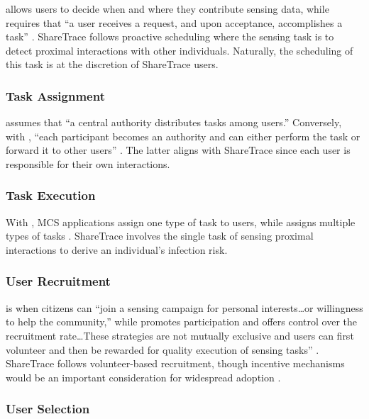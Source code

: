  allows users to decide when and where they contribute sensing data, while  requires that ``a user receives a request, and upon acceptance, accomplishes a task'' \citep{Capponi2019}. ShareTrace follows proactive scheduling where the sensing task is to detect proximal interactions with other individuals. Naturally, the scheduling of this task is at the discretion of ShareTrace users.

\subsubsection{Task Assignment}

 assumes that ``a central authority distributes tasks among users.'' Conversely, with , ``each participant becomes an authority and can either perform the task or forward it to other users'' \citep{Capponi2019}. The latter aligns with ShareTrace since each user is responsible for their own interactions.

\subsubsection{Task Execution}

With , MCS applications assign one type of task to users, while  assigns multiple types of tasks \citep{Capponi2019}. ShareTrace involves the single task of sensing proximal interactions to derive an individual's infection risk.

\subsubsection{User Recruitment}

 is when citizens can ``join a sensing campaign for personal interests{\ldots}or willingness to help the community,'' while  promotes participation and offers control over the recruitment rate{\ldots}These strategies are not mutually exclusive and users can first volunteer and then be rewarded for quality execution of sensing tasks'' \citep{Capponi2019}. ShareTrace follows volunteer-based recruitment, though incentive mechanisms would be an important consideration for widespread adoption \citep{Afroogh2022, Oyibo2022}.

\subsubsection{User Selection}

